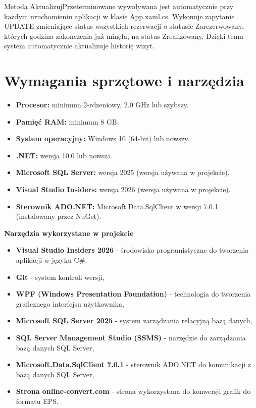 Metoda AktualizujPrzeterminowane wywoływana jest automatycznie przy każdym uruchomieniu aplikacji w klasie App.xaml.cs. 
Wykonuje zapytanie UPDATE zmieniające status wszystkich rezerwacji o statusie Zarezerwowany, których godzina 
zakończenia już minęła, na status Zrealizowany. Dzięki temu system automatycznie aktualizuje historię wizyt.



\section{Wymagania sprzętowe i narzędzia}

\begin{itemize}
\item \textbf{Procesor:} minimum 2-rdzeniowy, 2.0 GHz lub szybszy.
\item \textbf{Pamięć RAM:} minimum 8 GB.
\item \textbf{System operacyjny:} Windows 10 (64-bit) lub nowszy.
\item \textbf{.NET:} wersja 10.0 lub nowsza.
\item \textbf{Microsoft SQL Server:} wersja 2025 (wersja używana w projekcie).
\item \textbf{Visual Studio Insiders:} wersja 2026 (wersja używana w projekcie).
\item \textbf{Sterownik ADO.NET:} Microsoft.Data.SqlClient w wersji 7.0.1 
(instalowany przez NuGet).
\end{itemize}

\textbf{Narzędzia wykorzystane w projekcie}

\begin{itemize}
\item \textbf{Visual Studio Insiders 2026} - środowisko programistyczne do tworzenia aplikacji w języku C\#,
\item \textbf{Git} - system kontroli wersji,
\item \textbf{WPF (Windows Presentation Foundation)} - technologia do tworzenia graficznego interfejsu użytkownika,
\item \textbf{Microsoft SQL Server 2025} - system zarządzania relacyjną bazą danych,
\item \textbf{SQL Server Management Studio (SSMS)} - narzędzie do zarządzania bazą danych SQL Server,
\item \textbf{Microsoft.Data.SqlClient 7.0.1} - sterownik ADO.NET do komunikacji z bazą danych SQL Server,
\item \textbf{Strona online-convert.com} - strona wykorzystana do konwersji grafik do formatu EPS.
\end{itemize}